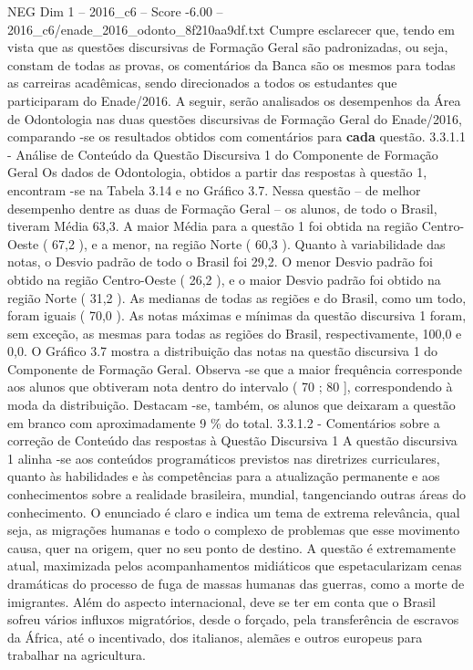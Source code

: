 \begin{textsample}{NEG Dim 1 – 2016\_c6 – Score -6.00 – 2016\_c6/enade\_2016\_odonto\_8f210aa9df.txt}
Cumpre esclarecer que, tendo em vista que as questões discursivas de Formação Geral são padronizadas, ou seja, constam de todas as provas, os comentários da Banca são os mesmos para todas as carreiras acadêmicas, sendo direcionados a todos os estudantes que participaram do Enade/2016.
A seguir, serão analisados os desempenhos da Área de Odontologia nas duas questões discursivas de Formação Geral do Enade/2016, comparando -se os resultados obtidos com comentários para \textbf{cada} questão. 3.3.1.1 - Análise de Conteúdo da Questão Discursiva 1 do Componente de Formação Geral Os dados de Odontologia, obtidos a partir das respostas à questão 1, encontram -se na Tabela 3.14 e no Gráfico 3.7.
Nessa questão – de melhor desempenho dentre as duas de Formação Geral – os alunos, de todo o Brasil, tiveram Média 63,3.
A maior Média para a questão 1 foi obtida na região Centro-Oeste ( 67,2 ), e a menor, na região Norte ( 60,3 ).
Quanto à variabilidade das notas, o Desvio padrão de todo o Brasil foi 29,2.
O menor Desvio padrão foi obtido na região Centro-Oeste ( 26,2 ), e o maior Desvio padrão foi obtido na região Norte ( 31,2 ).
As medianas de todas as regiões e do Brasil, como um todo, foram iguais ( 70,0 ).
As notas máximas e mínimas da questão discursiva 1 foram, sem exceção, as mesmas para todas as regiões do Brasil, respectivamente, 100,0 e 0,0.
O Gráfico 3.7 mostra a distribuição das notas na questão discursiva 1 do Componente de Formação Geral.
Observa -se que a maior frequência corresponde aos alunos que obtiveram nota dentro do intervalo ( 70 ; 80 ], correspondendo à moda da distribuição.
Destacam -se, também, os alunos que deixaram a questão em branco com aproximadamente 9 \% do total. 3.3.1.2 - Comentários sobre a correção de Conteúdo das respostas à Questão Discursiva 1 A questão discursiva 1 alinha -se aos conteúdos programáticos previstos nas diretrizes curriculares, quanto às habilidades e às competências para a atualização permanente e aos conhecimentos sobre a realidade brasileira, mundial, tangenciando outras áreas do conhecimento.
O enunciado é claro e indica um tema de extrema relevância, qual seja, as migrações humanas e todo o complexo de problemas que esse movimento causa, quer na origem, quer no seu ponto de destino.
A questão é extremamente atual, maximizada pelos acompanhamentos midiáticos que espetacularizam cenas dramáticas do processo de fuga de massas humanas das guerras, como a morte de imigrantes.
Além do aspecto internacional, deve se ter em conta que o Brasil sofreu vários influxos migratórios, desde o forçado, pela transferência de escravos da África, até o incentivado, dos italianos, alemães e outros europeus para trabalhar na agricultura.

\end{textsample}
